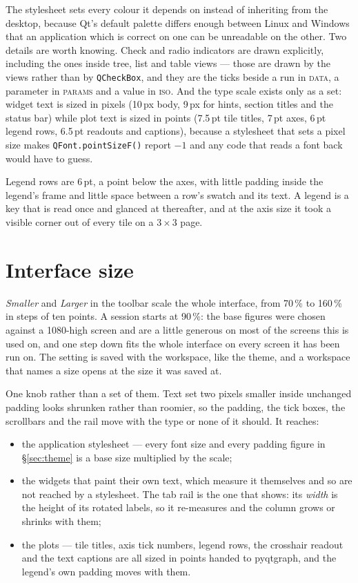 \documentclass[11pt,a4paper,oneside]{report}
\newcommand{\code}[1]{\texttt{#1}}
\newcommand{\tab}[1]{\textsc{#1}}
\begin{document}
The stylesheet sets every colour it depends on instead of inheriting from the
desktop, because Qt's default palette differs enough between Linux and Windows
that an application which is correct on one can be unreadable on the other. Two
details are worth knowing. Check and radio indicators are drawn explicitly,
including the ones inside tree, list and table views --- those are drawn by the
views rather than by \code{QCheckBox}, and they are the ticks beside a run in
\tab{data}, a parameter in \tab{params} and a value in \tab{iso}. And the type
scale exists only as a set: widget text is sized in pixels (10\,px body, 9\,px
for hints, section titles and the status bar) while plot text is sized in points
(7.5\,pt tile titles, 7\,pt axes, 6\,pt legend rows, 6.5\,pt readouts and
captions), because a stylesheet that sets a pixel size makes
\code{QFont.pointSizeF()} report $-1$ and any code that reads a font back would
have to guess.

Legend rows are 6\,pt, a point below the axes, with little padding inside the
legend's frame and little space between a row's swatch and its text. A legend is
a key that is read once and glanced at thereafter, and at the axis size it took
a visible corner out of every tile on a $3 \times 3$ page.

\section{Interface size}
\label{sec:uiscale}

\emph{Smaller} and \emph{Larger} in the toolbar scale the whole interface, from
70\,\% to 160\,\% in steps of ten points. A session starts at 90\,\%: the base
figures were chosen against a 1080-high screen and are a little generous on most
of the screens this is used on, and one step down fits the whole interface on
every screen it has been run on. The setting is saved with the workspace, like
the theme, and a workspace that names a size opens at the size it was saved at.

One knob rather than a set of them. Text set two pixels smaller inside
unchanged padding looks shrunken rather than roomier, so the padding, the tick
boxes, the scrollbars and the rail move with the type or none of it should. It
reaches:

\begin{itemize}
\item the application stylesheet --- every font size and every padding figure
  in \S\ref{sec:theme} is a base size multiplied by the scale;
\item the widgets that paint their own text, which measure it themselves and
  so are not reached by a stylesheet. The tab rail is the one that shows: its
  \emph{width} is the height of its rotated labels, so it re-measures and the
  column grows or shrinks with them;
\item the plots --- tile titles, axis tick numbers, legend rows, the crosshair
  readout and the text captions are all sized in points handed to pyqtgraph,
  and the legend's own padding moves with them.
\end{itemize}
\end{document}

